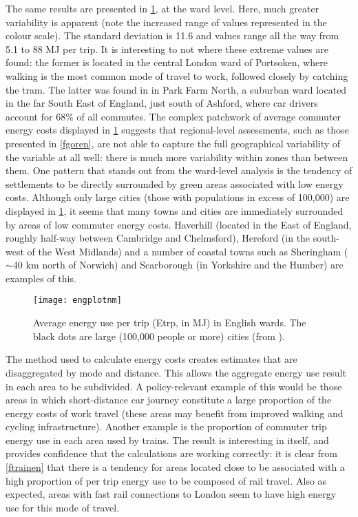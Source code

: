 The same results are presented in \cref{fengplotnm}, at the ward level.
Here, much greater variability is apparent (note the increased range of
values represented in the colour scale). The standard deviation is 11.6
and values range all the way from 5.1 to 88 MJ per trip.
It is interesting to not where these extreme values are found:
the former is located in the central London ward of
Portsoken, where walking is the most common mode of travel to work,
followed closely by catching the tram. The latter was
found in in Park Farm North,
a suburban ward located in the far South East of England, just south of
Ashford, where car drivers account for 68\% of all commutes. The complex
patchwork of average  commuter energy costs displayed in \cref{fengplotnm}
suggests that regional-level assessments, such as those
presented in \cref{fgoren}, are not able to capture the full geographical
variability of the variable at all well: there is much more variability
within zones than between them. One pattern that stands out from the ward-level
analysis is the tendency of settlements to be directly surrounded by green areas
associated with low energy costs. Although only large cities (those with
populations in excess of 100,000) are displayed in
\cref{fengplotnm}, it seems that many towns and cities are immediately surrounded
by areas of low commuter energy costs. Haverhill (located in the East of
England, roughly half-way between Cambridge and Chelmsford),
Hereford (in the south-west of the West Midlands) and a number of coastal
towns such as  Sheringham ($\sim$40 km north of Norwich) and Scarborough
(in Yorkshire and the Humber) are examples of this.
\begin{figure}[htbp]
\begin{center}
    \texttt{[image: engplotnm]}  \end{center}
  \caption[Average energy use per trip (Etrp, in MJ) in English wards]
  {Average energy use per trip (Etrp, in MJ) in English wards.
  The black dots are large (100,000 people or more) cities (from
  \citet{Brownrigg2013}).}
 \label{fengplotnm}
\end{figure}

The method used to calculate energy costs creates estimates
that are disaggregated by mode and distance. This allows the
aggregate energy use result in each area to be subdivided.
A policy-relevant example of this would be those areas in which
short-distance car journey constitute
a large proportion of the energy costs of work travel (these areas
may benefit from improved walking and cycling infrastructure). Another example
is the proportion of commuter trip energy use
in each area used by trains. The result is interesting in itself, and
provides confidence that the calculations are working correctly:
it is clear from \cref{ftrainen} that there is a tendency for
areas located close to be associated with a high proportion of per trip energy
use to be composed of rail travel. Also as expected, areas with fast rail
connections to London seem to have high energy use for this mode of travel.

